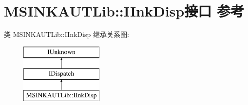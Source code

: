 \hypertarget{interface_m_s_i_n_k_a_u_t_lib_1_1_i_ink_disp}{}\section{M\+S\+I\+N\+K\+A\+U\+T\+Lib\+:\+:I\+Ink\+Disp接口 参考}
\label{interface_m_s_i_n_k_a_u_t_lib_1_1_i_ink_disp}
类 M\+S\+I\+N\+K\+A\+U\+T\+Lib\+:\+:I\+Ink\+Disp 继承关系图\+:\begin{figure}[H]
\begin{center}
\leavevmode
\includegraphics[height=3.000000cm]{interface_m_s_i_n_k_a_u_t_lib_1_1_i_ink_disp}
\end{center}
\end{figure}
